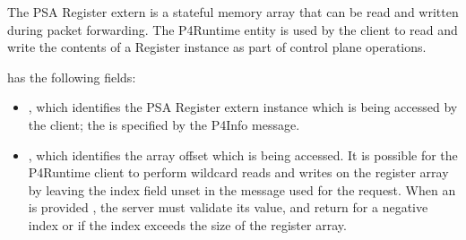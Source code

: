 \documentclass[11pt]{article}
\begin{document}
{%
\noindent{}The PSA Register extern is a stateful memory array that can be read and written
during packet forwarding. The  P4Runtime entity is used by the
client to read and write the contents of a Register instance as part of
control plane operations.%

 has the following fields:%

\begin{itemize}%

\item{}
, which identifies the PSA Register extern instance which is
being accessed by the client; the  is specified by the P4Info
message.%

\item{}
, which identifies the array offset which is being accessed. It is
possible for the P4Runtime client to perform wildcard reads and writes on the
register array by leaving the index field unset in the  message
used for the request. When an  is provided , the server must validate
its value, and return  for a negative index or
 if the index exceeds the size of the register array.%


\end{itemize}}
\end{document}
